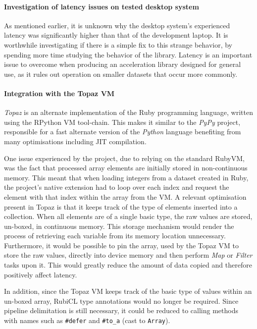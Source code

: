 \paragraph*{Investigation of latency issues on tested desktop system} As mentioned earlier, it is unknown why the desktop system's experienced latency was significantly higher than that of the development laptop. It is worthwhile investigating if there is a simple fix to this strange behavior, by spending more time studying the behavior of the library. Latency is an important issue to overcome when producing an acceleration library designed for general use, as it rules out operation on smaller datasets that occur more commonly.

\paragraph*{Integration with the Topaz VM}
\emph{Topaz}\cite{topaz} is an alternate implementation of the Ruby programming language, written using the RPython VM tool-chain. This makes it similar to the \emph{PyPy} project, responsible for a fast alternate version of the \emph{Python} language benefiting from many optimisations including \ac{JIT} compilation.

One issue experienced by the project, due to relying on the standard RubyVM, was the fact that processed array elements are initially stored in non-continuous memory. This meant that when loading integers from a dataset created in Ruby, the project's native extension had to loop over each index and request the element with that index within the array from the VM. A relevant optimisation present in Topaz is that it keeps track of the type of elements inserted into a collection. When all elements are of a single basic type, the raw values are stored, un-boxed, in continuous memory. This storage mechanism would render the process of retrieving each variable from its memory location unnecessary. Furthermore, it would be possible to pin the array, used by the Topaz VM to store the raw values, directly into device memory and then perform \emph{Map} or \emph{Filter} tasks upon it. This would greatly reduce the amount of data copied and therefore positively affect latency.

In addition, since the Topaz VM keeps track of the basic type of values within an un-boxed array, RubiCL type annotations would no longer be required. Since pipeline delimitation is still necessary, it could be reduced to calling methods with names such as \verb|#defer| and \verb|#to_a| (cast to \verb|Array|).

